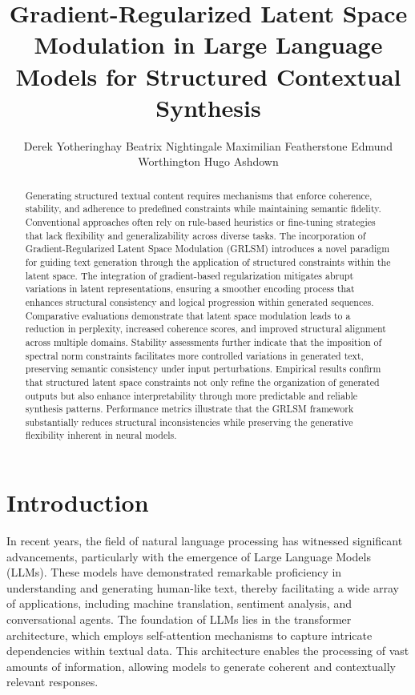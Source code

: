 \documentclass{article}
\title{Gradient-Regularized Latent Space Modulation in Large Language Models for Structured Contextual Synthesis}
\author{%
Derek Yotheringhay \And
Beatrix Nightingale \And Maximilian Featherstone \And Edmund Worthington   \And Hugo Ashdown }
\begin{document}
\maketitle


\begin{abstract}
Generating structured textual content requires mechanisms that enforce coherence, stability, and adherence to predefined constraints while maintaining semantic fidelity. Conventional approaches often rely on rule-based heuristics or fine-tuning strategies that lack flexibility and generalizability across diverse tasks. The incorporation of Gradient-Regularized Latent Space Modulation (GRLSM) introduces a novel paradigm for guiding text generation through the application of structured constraints within the latent space. The integration of gradient-based regularization mitigates abrupt variations in latent representations, ensuring a smoother encoding process that enhances structural consistency and logical progression within generated sequences. Comparative evaluations demonstrate that latent space modulation leads to a reduction in perplexity, increased coherence scores, and improved structural alignment across multiple domains. Stability assessments further indicate that the imposition of spectral norm constraints facilitates more controlled variations in generated text, preserving semantic consistency under input perturbations. Empirical results confirm that structured latent space constraints not only refine the organization of generated outputs but also enhance interpretability through more predictable and reliable synthesis patterns. Performance metrics illustrate that the GRLSM framework substantially reduces structural inconsistencies while preserving the generative flexibility inherent in neural models.

\end{abstract}


\section{Introduction}

In recent years, the field of natural language processing has witnessed significant advancements, particularly with the emergence of Large Language Models (LLMs). These models have demonstrated remarkable proficiency in understanding and generating human-like text, thereby facilitating a wide array of applications, including machine translation, sentiment analysis, and conversational agents. The foundation of LLMs lies in the transformer architecture, which employs self-attention mechanisms to capture intricate dependencies within textual data. This architecture enables the processing of vast amounts of information, allowing models to generate coherent and contextually relevant responses.
\end{document}
